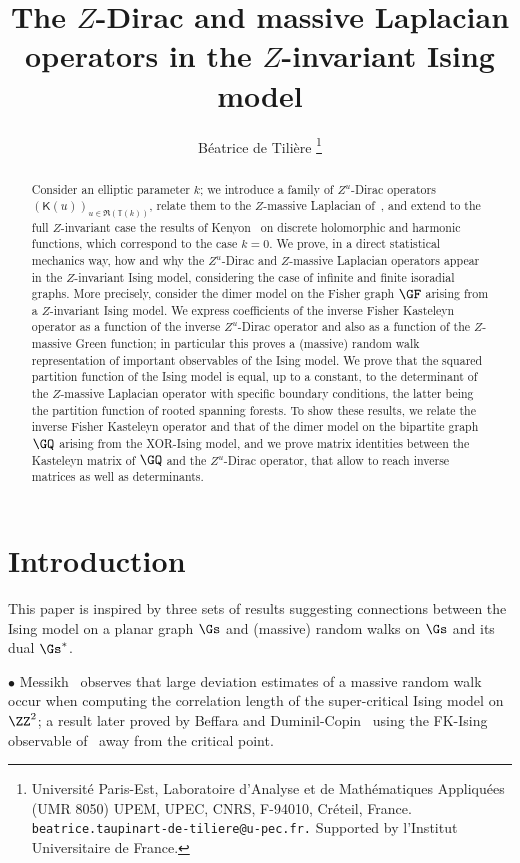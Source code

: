 \documentclass[a4paper,twoside,11pt]{article}
\title{The $Z$-Dirac and massive Laplacian operators in the $Z$-invariant Ising model}
\author{B\'eatrice de Tili\`ere
\thanks{{\small Universit\'{e} Paris-Est, Laboratoire d'Analyse et de Math\'{e}matiques Appliqu\'{e}es (UMR 8050) 
UPEM, UPEC, CNRS, F-94010, Créteil, France.}
{\small\texttt{beatrice.taupinart-de-tiliere@u-pec.fr.}}
{\small Supported by l'Institut Universitaire de France.}
}}
\begin{document}
\maketitle

\begin{abstract}
\hspace{0.2cm} Consider an elliptic parameter $k$; we introduce a family of $Z^u$-Dirac operators 
$(\mathsf{K}(u))_{u\in\Re(\mathbb{T}(k))}$,
relate them to the $Z$-massive Laplacian of~\cite{BdTR1}, and 
extend to the full $Z$-invariant case
the results of Kenyon~\cite{Kenyon3} on discrete holomorphic and harmonic functions, which correspond to the case $k=0$.
We prove, in a direct statistical mechanics way, how and why the $Z^u$-Dirac and $Z$-massive Laplacian operators appear in the 
$Z$-invariant Ising model, considering the case of infinite and finite isoradial graphs.
More precisely, consider the dimer model on the Fisher graph $\GF$ arising from a $Z$-invariant Ising model.
We express coefficients of the inverse Fisher Kasteleyn operator as a function of the inverse $Z^u$-Dirac operator and 
also as a function of the $Z$-massive Green function; in particular this proves a (massive) random walk representation of important observables of the 
Ising model. We prove that the squared partition function of the Ising model is equal, up to a constant, 
to the determinant of the $Z$-massive Laplacian operator with specific boundary conditions, the latter being
the partition function of rooted spanning forests. To show these results,
we relate the inverse Fisher Kasteleyn operator and that of the dimer model on the bipartite graph $\GQ$ arising from 
the XOR-Ising model, and we prove matrix identities between the Kasteleyn matrix of $\GQ$ and the $Z^u$-Dirac operator, 
that allow to reach inverse matrices as well as determinants.
\end{abstract}


\section{Introduction}

This paper is inspired by three sets of results suggesting connections between the Ising model on a planar graph $\Gs$
and (massive) random walks on $\Gs$ and its dual $\Gs^*$. 

$\bullet$ Messikh~\cite{Messikh} observes that large deviation estimates of 
a massive random walk occur when computing the correlation length of the super-critical Ising model on $\ZZ^2$; a result later
proved by Beffara and Duminil-Copin~\cite{BeffaraDuminil} using the FK-Ising observable of~\cite{Smirnov2} away from the critical point.
\end{document}
